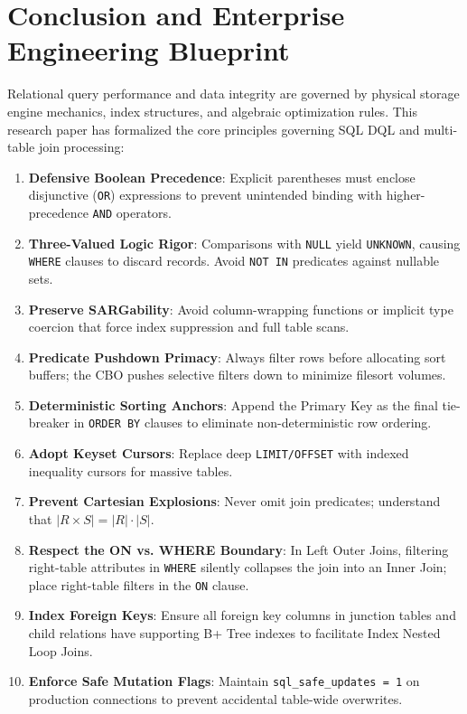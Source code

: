 \documentclass[10pt,twocolumn,letterpaper]{article}
\begin{document}
\section{Conclusion and Enterprise Engineering Blueprint}
\label{sec:conclusion}

Relational query performance and data integrity are governed by physical storage engine mechanics, index structures, and algebraic optimization rules. This research paper has formalized the core principles governing SQL DQL and multi-table join processing:

\begin{enumerate}
    \item \textbf{Defensive Boolean Precedence}: Explicit parentheses must enclose disjunctive (\texttt{OR}) expressions to prevent unintended binding with higher-precedence \texttt{AND} operators.
    \item \textbf{Three-Valued Logic Rigor}: Comparisons with \texttt{NULL} yield \texttt{UNKNOWN}, causing \texttt{WHERE} clauses to discard records. Avoid \texttt{NOT IN} predicates against nullable sets.
    \item \textbf{Preserve SARGability}: Avoid column-wrapping functions or implicit type coercion that force index suppression and full table scans.
    \item \textbf{Predicate Pushdown Primacy}: Always filter rows before allocating sort buffers; the CBO pushes selective filters down to minimize filesort volumes.
    \item \textbf{Deterministic Sorting Anchors}: Append the Primary Key as the final tie-breaker in \texttt{ORDER BY} clauses to eliminate non-deterministic row ordering.
    \item \textbf{Adopt Keyset Cursors}: Replace deep \texttt{LIMIT/OFFSET} with indexed inequality cursors for massive tables.
    \item \textbf{Prevent Cartesian Explosions}: Never omit join predicates; understand that $|R \times S| = |R| \cdot |S|$.
    \item \textbf{Respect the ON vs. WHERE Boundary}: In Left Outer Joins, filtering right-table attributes in \texttt{WHERE} silently collapses the join into an Inner Join; place right-table filters in the \texttt{ON} clause.
    \item \textbf{Index Foreign Keys}: Ensure all foreign key columns in junction tables and child relations have supporting B+ Tree indexes to facilitate Index Nested Loop Joins.
    \item \textbf{Enforce Safe Mutation Flags}: Maintain \texttt{sql\_safe\_updates = 1} on production connections to prevent accidental table-wide overwrites.
\end{enumerate}
\end{document}
